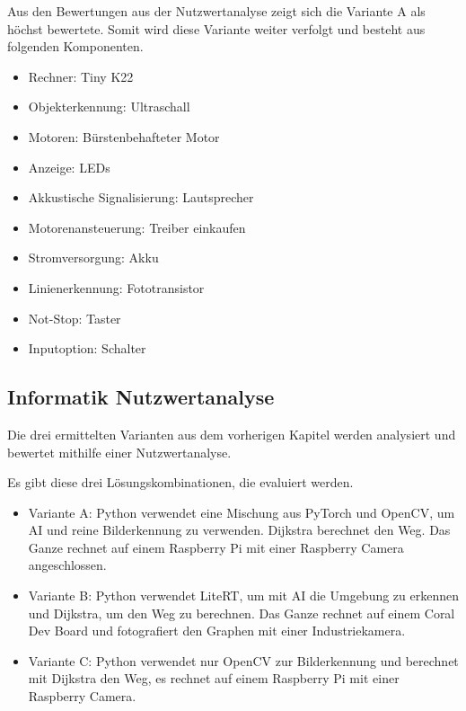 Aus den Bewertungen aus der Nutzwertanalyse zeigt sich die Variante A als höchst bewertete. Somit wird diese Variante weiter verfolgt und besteht aus folgenden Komponenten.

\begin{itemize}
    \item Rechner: Tiny K22
    \item Objekterkennung: Ultraschall
    \item Motoren: Bürstenbehafteter Motor
    \item Anzeige: LEDs 
    \item Akkustische Signalisierung: Lautsprecher
    \item Motorenansteuerung: Treiber einkaufen
    \item Stromversorgung: Akku
    \item Linienerkennung: Fototransistor
    \item Not-Stop: Taster
    \item Inputoption: Schalter
\end{itemize}

\subsection{Informatik Nutzwertanalyse}

Die drei ermittelten Varianten aus dem vorherigen Kapitel werden analysiert und bewertet mithilfe einer Nutzwertanalyse.

Es gibt diese drei Lösungskombinationen, die evaluiert werden.

\begin{itemize}
     \item Variante A: Python verwendet eine Mischung aus PyTorch und OpenCV, um AI und reine Bilderkennung zu verwenden. Dijkstra berechnet den Weg. Das Ganze rechnet auf einem Raspberry Pi mit einer Raspberry Camera angeschlossen.
    \item  Variante B: Python verwendet LiteRT, um mit AI die Umgebung zu erkennen und Dijkstra, um den Weg zu berechnen. Das Ganze rechnet auf einem Coral Dev Board und fotografiert den Graphen mit einer Industriekamera.
    \item Variante C: Python verwendet nur OpenCV zur Bilderkennung und berechnet mit Dijkstra den Weg, es rechnet auf einem Raspberry Pi mit einer Raspberry Camera.
\end{itemize}

